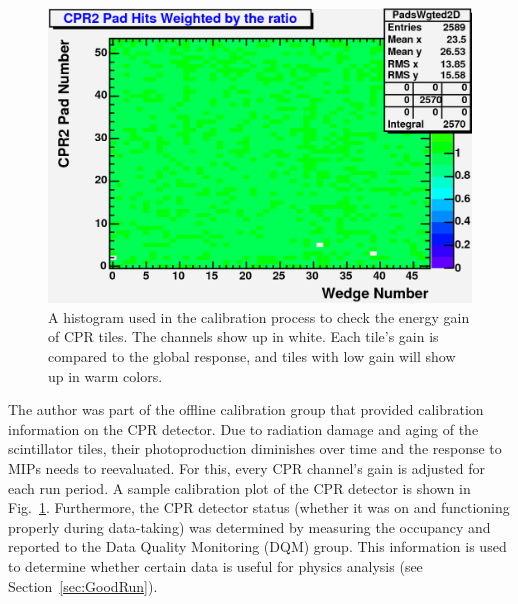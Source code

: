 \begin{figure}[htb!]
 \centering
 \includegraphics[scale=0.35,keepaspectratio=true]{./CPRcalibration1.png}
 \caption{A histogram used in the calibration process to check the energy gain of CPR tiles. The  channels show up in white. Each tile's gain is compared to the global response, and tiles with low gain will show up in warm colors.}
 \label{fig:CPRcalibration}
\end{figure}

The author was part of the offline calibration group that provided calibration information on the CPR detector. Due to radiation damage and aging of the scintillator tiles, their photoproduction diminishes over time and the response to MIPs needs to reevaluated. For this, every CPR channel's gain is adjusted for each run period. A sample calibration plot of the CPR detector is shown in Fig.~\ref{fig:CPRcalibration}. Furthermore, the CPR detector status (whether it was on and functioning properly during data-taking) was determined by measuring the occupancy and reported to the Data Quality Monitoring (DQM) group. This information is used to determine whether certain data is useful for physics analysis (see Section~\ref{sec:GoodRun}).

